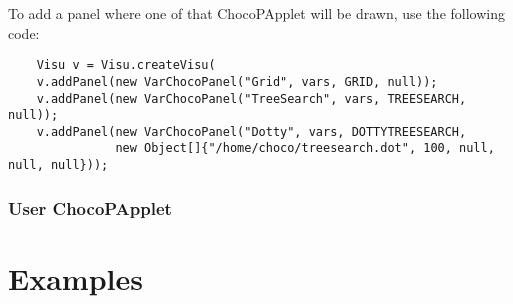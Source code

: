 To add a panel where one of that ChocoPApplet will be drawn, use the following code:
\begin{lstlisting}
	Visu v = Visu.createVisu(
	v.addPanel(new VarChocoPanel("Grid", vars, GRID, null));
	v.addPanel(new VarChocoPanel("TreeSearch", vars, TREESEARCH, null));
	v.addPanel(new VarChocoPanel("Dotty", vars, DOTTYTREESEARCH,
               new Object[]{"/home/choco/treesearch.dot", 100, null, null, null}));
\end{lstlisting}

\subsubsection{User ChocoPApplet}\label{chocoandvisu:userchocopapplet}\hypertarget{chocoandvisu:userchocopapplet}{}


\section{Examples}\label{chocoandvisu:examples}\hypertarget{chocoandvisu:examples}{}


